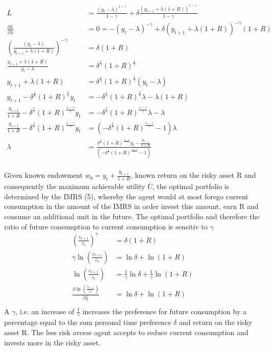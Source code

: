 \documentclass[12pt]{article}
\begin{document}
		\begin{align*}
		L &= \frac{(y_t - \lambda)^{1-\gamma}}{1-\gamma} + \delta \frac{(y_{t+1} + \lambda(1+R))^{1-\gamma}}{1-\gamma}\\
		\frac{\partial L}{\partial \lambda} &= 0 = -(y_t - \lambda)^{-\gamma} + \delta (y_{t+1} + \lambda(1+R))^{-\gamma}(1+R)\\
		\left(\frac{(y_t - \lambda)}{y_{t+1} + \lambda(1+R)}\right)^{-\gamma} &= \delta (1+R)\\
		\frac{y_{t+1} + \lambda(1+R)}{y_t - \lambda} &= \delta^{\frac{1}{\gamma}} (1+R)^\frac{1}{\gamma}\\
		y_{t+1} + \lambda(1+R) &= \delta^{\frac{1}{\gamma}} (1+R)^\frac{1}{\gamma}(y_t - \lambda)\\
		y_{t+1} - \delta^{\frac{1}{\gamma}} (1+R)^\frac{1}{\gamma}y_t &= - \delta^{\frac{1}{\gamma}} (1+R)^\frac{1}{\gamma} \lambda - \lambda(1+R)\\
		\frac{y_{t+1}}{1+R} - \delta^{\frac{1}{\gamma}} (1+R)^\frac{1-\gamma}{\gamma}y_t &= - \delta^{\frac{1}{\gamma}} (1+R)^\frac{1-\gamma}{\gamma} \lambda - \lambda\\
		\frac{y_{t+1}}{1+R} - \delta^{\frac{1}{\gamma}} (1+R)^\frac{1-\gamma}{\gamma}y_t &= (- \delta^{\frac{1}{\gamma}} (1+R)^\frac{1-\gamma}{\gamma} - 1)\lambda\\
		\lambda &= \frac{\delta^{\frac{1}{\gamma}} (1+R)^\frac{1-\gamma}{\gamma}y_t - \frac{y_{t+1}}{1+R}}{(- \delta^{\frac{1}{\gamma}} (1+R)^\frac{1-\gamma}{\gamma} - 1)}\\
	\end{align*}
	
	Given known endowment $w_0 = y_t + \frac{y_{t+1}}{1+R}$, known return on the risky asset R and consequently the maximum achievable utility $\bar{U}$, the optimal portfolio is determined by the IMRS (5), whereby the agent would at most forego current consumption in the amount of the IMRS in order invest this amount, earn R and consume an additional unit in the future.  The optimal portfolio and therefore the ratio of future consumption to current consumption is sensitiv to $\gamma$
	\begin{align*}
		\left(\frac{c_{t+1}}{c_t}\right)^\gamma &= \delta (1+R)\\
		\gamma \ln \left(\frac{c_{t+1}}{c_t}\right) &= \ln \delta + \ln (1+R)\\
		\ln \left(\frac{c_{t+1}}{c_t}\right) &= \frac{1}{\gamma} \ln \delta + \frac{1}{\gamma} \ln (1+R)\\
		\frac{\partial \ln \left(\frac{c_{t+1}}{c_t}\right)}{\partial \frac{1}{\gamma}} &= \ln \delta + \ln (1+R)\\
	\end{align*}
	A  $\gamma$, i.e. an increase of $\frac{1}{\gamma}$ increases the preference for future consumption by a percentage equal to the sum personal time preference $\delta$ and return on the risky asset R. The less risk averse agent accepts to reduce current consumption and invests more in the risky asset. 
	
\end{document}
